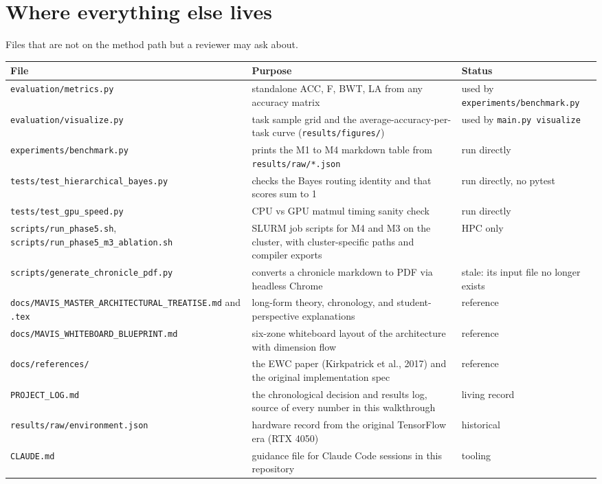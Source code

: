 \documentclass[11pt,a4paper]{article}
\newcommand{\code}[1]{\texttt{#1}}
\begin{document}
\section{Where everything else lives}

Files that are not on the method path but a reviewer may ask about.

\begin{tabularx}{\textwidth}{L{5.6cm} Y L{3.2cm}}
\toprule
File & Purpose & Status \\
\midrule
\code{evaluation/metrics.py} & standalone ACC, F, BWT, LA from any accuracy matrix & used by \code{experiments/benchmark.py} \\
\code{evaluation/visualize.py} & task sample grid and the average-accuracy-per-task curve (\code{results/figures/}) & used by \code{main.py visualize} \\
\code{experiments/benchmark.py} & prints the M1 to M4 markdown table from \code{results/raw/*.json} & run directly \\
\code{tests/test\_hierarchical\_bayes.py} & checks the Bayes routing identity and that scores sum to 1 & run directly, no pytest \\
\code{tests/test\_gpu\_speed.py} & CPU vs GPU matmul timing sanity check & run directly \\
\code{scripts/run\_phase5.sh}, \code{scripts/run\_phase5\_m3\_ablation.sh} & SLURM job scripts for M4 and M3 on the cluster, with cluster-specific paths and compiler exports & HPC only \\
\code{scripts/generate\_chronicle\_pdf.py} & converts a chronicle markdown to PDF via headless Chrome & stale: its input file no longer exists \\
\code{docs/MAVIS\_MASTER\_ARCHITECTURAL\_TREATISE.md} and \code{.tex} & long-form theory, chronology, and student-perspective explanations & reference \\
\code{docs/MAVIS\_WHITEBOARD\_BLUEPRINT.md} & six-zone whiteboard layout of the architecture with dimension flow & reference \\
\code{docs/references/} & the EWC paper (Kirkpatrick et al., 2017) and the original implementation spec & reference \\
\code{PROJECT\_LOG.md} & the chronological decision and results log, source of every number in this walkthrough & living record \\
\code{results/raw/environment.json} & hardware record from the original TensorFlow era (RTX 4050) & historical \\
\code{CLAUDE.md} & guidance file for Claude Code sessions in this repository & tooling \\
\bottomrule
\end{tabularx}
\end{document}
